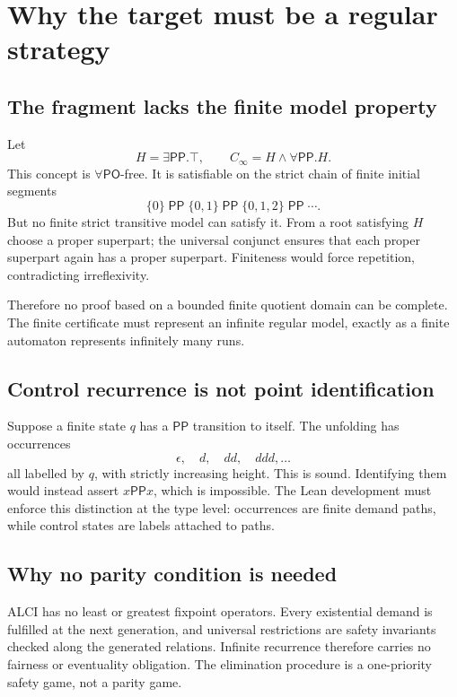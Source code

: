 \documentclass[11pt]{article}
\newcommand{\PP}{\mathsf{PP}}
\newcommand{\PO}{\mathsf{PO}}
\begin{document}
\section{Why the target must be a regular strategy}

\subsection{The fragment lacks the finite model property}

Let
\[
  H=\exists\PP.\top,\qquad
  C_{\infty}=H\wedge\forall\PP.H.
\]
This concept is $\forall\PO$-free. It is satisfiable on the strict chain of finite initial
segments
\[
  \{0\}\;\PP\;\{0,1\}\;\PP\;\{0,1,2\}\;\PP\;\cdots.
\]
But no finite strict transitive model can satisfy it. From a root satisfying $H$ choose a
proper superpart; the universal conjunct ensures that each proper superpart again has a
proper superpart. Finiteness would force repetition, contradicting irreflexivity.

Therefore no proof based on a bounded finite quotient domain can be complete. The finite
certificate must represent an infinite regular model, exactly as a finite automaton
represents infinitely many runs.

\subsection{Control recurrence is not point identification}

Suppose a finite state $q$ has a $\PP$ transition to itself. The unfolding has occurrences
\[
  \epsilon,\quad d,\quad dd,\quad ddd,\ldots
\]
all labelled by $q$, with strictly increasing height. This is sound. Identifying them
would instead assert $x\PP x$, which is impossible. The Lean development must enforce
this distinction at the type level: occurrences are finite demand paths, while control
states are labels attached to paths.

\subsection{Why no parity condition is needed}

ALCI has no least or greatest fixpoint operators. Every existential demand is fulfilled
at the next generation, and universal restrictions are safety invariants checked along
the generated relations. Infinite recurrence therefore carries no fairness or eventuality
obligation. The elimination procedure is a one-priority safety game, not a parity game.
\end{document}

